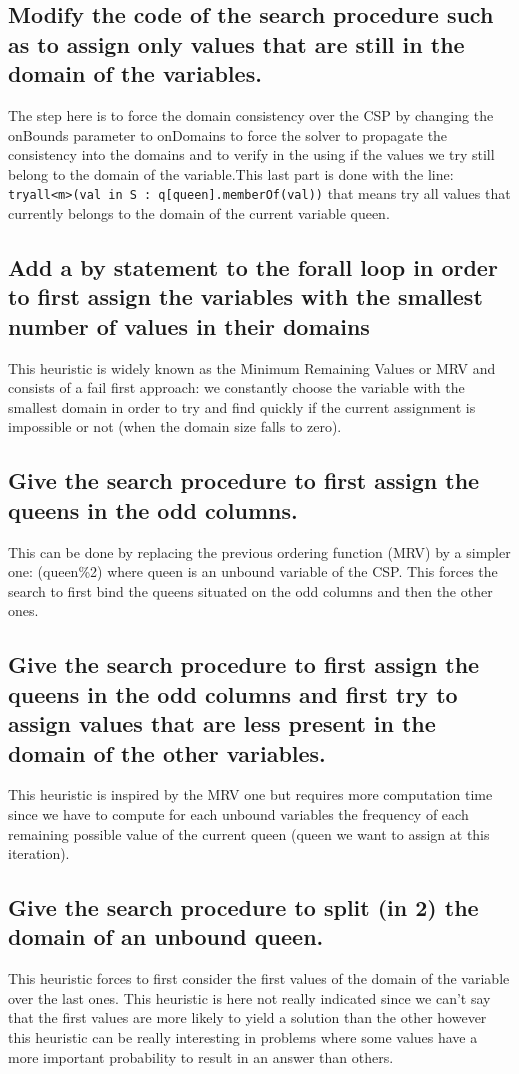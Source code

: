 \documentclass[a4paper ,12pt,french]{article}
\begin{document}
\subsection{Modify the code of the search procedure such as to assign only values that are still in the domain of the variables.}
The step here is to force the domain consistency over the CSP by changing the onBounds parameter to onDomains to force the solver to propagate the consistency into the domains and to verify in the using if the values we try still belong to the domain of the variable.This last part is done with the line: \texttt{tryall<m>(val in S : q[queen].memberOf(val))} that means try all values that currently belongs to the domain of the current variable queen.
\subsection{Add a by statement to the forall loop in order to first assign the variables with the smallest number of values in their domains}
This heuristic is widely known as the Minimum Remaining Values or MRV and consists of a fail first approach: we constantly choose the variable with the smallest domain in order to try and find quickly if the current assignment is impossible or not (when the domain size falls to zero). 
\subsection{Give the search procedure to first assign the queens in the odd columns.}
This can be done by replacing the previous ordering function (MRV) by a simpler one: (queen\%2) where queen is an unbound variable of the CSP. This forces the search to first bind the queens situated on the odd columns and then the other ones. 
\subsection{Give the search procedure to first assign the queens in the odd columns and first try to assign values that are less present in the domain of the other variables.}
This heuristic is inspired by the MRV one but requires more computation time since we have to compute for each unbound variables the frequency of each remaining possible value of the current queen (queen we want to assign at this iteration).
\subsection{Give the search procedure to split (in 2) the domain of an unbound queen.}
This heuristic forces to first consider the first values of the domain of the variable over the last ones. This heuristic is here not really indicated since we can't say that the first values are more likely to yield a solution than the other however this heuristic can be really interesting in problems where some values have a more important probability to result in an answer than others.
\end{document}
